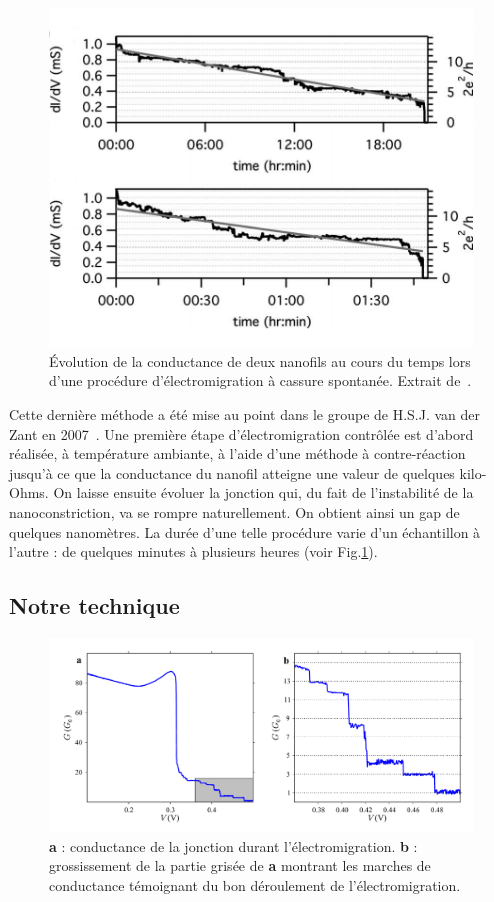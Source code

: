 \begin{figure}
\parbox{7cm}{
\includegraphics[scale=0.45]{Fabrication/ElecMigExemp/ZantFig.pdf} 
}
\parbox{6.5cm}{\caption{Évolution de la conductance de deux nanofils au cours du temps lors d'une procédure d'électromigration à cassure spontanée. Extrait de~\cite{ONeill2007}.}
\label{ZantExemp}
}
\end{figure}
Cette dernière méthode a été mise au point dans le groupe de H.S.J. van der Zant en 2007~\cite{ONeill2007}. Une première étape d'électromigration contrôlée est d'abord réalisée, à température ambiante, à l'aide d'une méthode à contre-réaction jusqu'à ce que la conductance du nanofil atteigne une valeur de quelques kilo-Ohms. On laisse ensuite évoluer la jonction qui, du fait de l'instabilité de la nanoconstriction, va se rompre naturellement. On obtient ainsi un gap de quelques nanomètres. La durée d'une telle procédure varie d'un échantillon à l'autre : de quelques minutes à plusieurs heures (voir Fig.\ref{ZantExemp}).


\subsection{Notre technique}


\begin{figure}
\centering \includegraphics[scale=0.45]{Fabrication/NotreElectroMig/NotreElectroMig.pdf}
\caption{\textbf{a} : conductance de la jonction durant l'électromigration. \textbf{b} : grossissement de la partie grisée de \textbf{a} montrant les marches de conductance témoignant du bon déroulement de l'électromigration.}
\label{NotreElecMig}
\end{figure}

